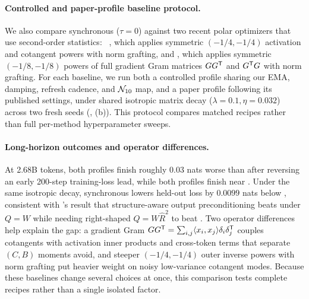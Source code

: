 \paragraph{Controlled and paper-profile baseline protocol.}
We also compare synchronous  ($\tau=0$) against two recent polar optimizers that use second-order statistics: ~\citep{che2026gomuon}, which applies symmetric $(-1/4,-1/4)$ activation and cotangent powers with norm grafting, and  \citep{zhang2026mousse}, which applies symmetric $(-1/8,-1/8)$ powers of full gradient Gram matrices $GG^{{\mathsf{T}}}$ and $G^{{\mathsf{T}}}G$ with norm grafting. For each baseline, we run both a controlled profile sharing our EMA, damping, refresh cadence, and $\mathcal{N}_{10}$ map, and a paper profile following its published settings, under shared isotropic matrix decay ($\lambda=0.1,\eta=0.032$) across two fresh seeds (, (b)). This protocol compares matched recipes rather than full per-method hyperparameter sweeps.



\paragraph{Long-horizon outcomes and operator differences.}
At 2.68B tokens, both  profiles finish roughly $0.03$ nats worse than  after reversing an early 200-step training-loss lead, while both  profiles finish near . Under the same isotropic decay, synchronous  lowers held-out loss by $0.0099$ nats below , consistent with 's result that structure-aware output preconditioning beats  under $Q=W$ while needing right-shaped $Q=W\hat R^2$ to beat . Two operator differences help explain the gap: a gradient Gram $GG^{{\mathsf{T}}}=\sum_{i,j}\langle x_i,x_j\rangle\delta_i\delta_j^{{\mathsf{T}}}$ couples cotangents with activation inner products and cross-token terms that separate $(C,B)$ moments avoid, and steeper $(-1/4,-1/4)$ outer inverse powers with norm grafting put heavier weight on noisy low-variance cotangent modes. Because these baselines change several choices at once, this comparison tests complete recipes rather than a single isolated factor.
